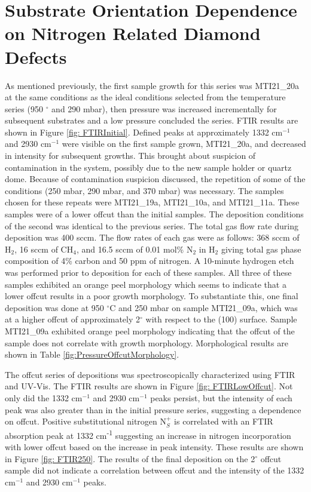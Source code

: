 \section{Substrate Orientation Dependence on Nitrogen Related Diamond Defects}
\label{offcutSeries}
\indent

As mentioned previously, the first sample growth for this series was MTI21\_20a at the same conditions as the ideal conditions selected from the temperature series (950 $^{\circ}$ and 290 mbar), then pressure was increased incrementally for subsequent substrates and a low pressure concluded the series. FTIR results are shown in Figure \ref{fig: FTIRInitial}. Defined peaks at approximately 1332 cm$^{-1}$ and 2930 cm$^{-1}$ were visible on the first sample grown, MTI21\_20a, and decreased in intensity for subsequent growths. This brought about suspicion of contamination in the system, possibly due to the new sample holder or quartz dome. Because of contamination suspicion discussed, the repetition of some of the conditions (250 mbar, 290 mbar, and 370 mbar) was necessary. The samples chosen for these repeats were MTI21\_19a, MTI21\_10a, and MTI21\_11a. These samples were of a lower offcut than the initial samples. The deposition conditions of the second was identical to the previous series. The total gas flow rate during deposition was 400 sccm. The flow rates of each gas were as follows: 368 sccm of H$_2$, 16 sccm of CH$_4$, and 16.5 sccm of 0.01 mol\% N$_2$ in H$_2$ giving total gas phase composition of 4\% carbon and 50 ppm of nitrogen. A 10-minute hydrogen etch was performed prior to deposition for each of these samples. All three of these samples exhibited an orange peel morphology which seems to indicate that a lower offcut results in a poor growth morphology. To substantiate this, one final deposition was done at 950 $^{\circ}$C and 250 mbar on sample MTI21\_09a, which was at a higher offcut of approximately 2$^{\circ}$ with respect to the (100) surface. Sample MTI21\_09a exhibited orange peel morphology indicating that the offcut of the sample does not correlate with growth morphology. Morphological results are shown in Table \ref{fig:PressureOffcutMorphology}.

The offcut series of depositions was spectroscopically characterized using FTIR and UV-Vis. The FTIR results are shown in Figure \ref{fig: FTIRLowOffcut}. Not only did the 1332 cm$^{-1}$ and 2930 cm$^{-1}$ peaks persist, but the intensity of each peak was also greater than in the initial pressure series, suggesting a dependence on offcut. Positive substitutional nitrogen N$_S^+$ is correlated with an FTIR absorption peak at 1332 cm\textsuperscript{-1} suggesting an increase in nitrogen incorporation with lower offcut based on the increase in peak intensity. These results are shown in Figure \ref{fig: FTIR250}. The results of the final deposition on the 2$^\circ$ offcut sample did not indicate a correlation between offcut and the intensity of the 1332 cm$^{-1}$ and 2930 cm$^{-1}$ peaks. 

